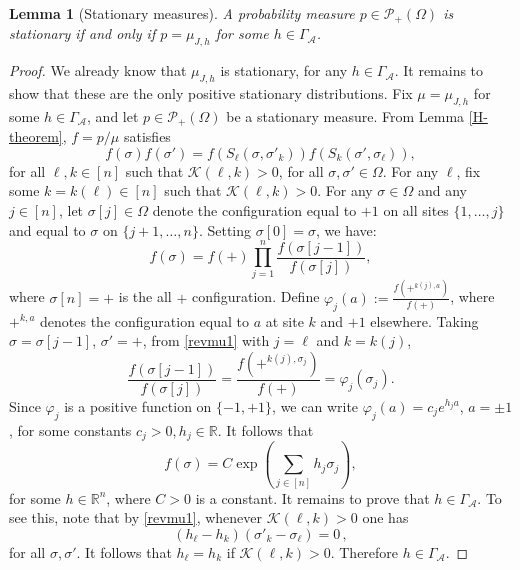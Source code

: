 \documentclass[11pt,reqno]{amsart}
\numberwithin{equation}{section}
\numberwithin{figure}{section}
\newtheorem{lemma}[theorem]{Lemma}
\newcommand{\1}{\mathds{1}}
\let\si=\sigma
\let\G=\Gamma
\newcommand{\cA}{\ensuremath{\mathcal A}}
\newcommand{\cK}{\ensuremath{\mathcal K}}
\newcommand{\bbR}{{\ensuremath{\mathbb R}} }
\begin{document}
\begin{lemma}[Stationary measures] \label{charact-of-stationarity}
A probability measure \(p \in \mathcal{P}_+(\Omega)\)
is stationary  if and only if \(p =\mu_{J,h}\) for some $h\in\G_\cA$.
\end{lemma}
\begin{proof}%
We already know that $\mu_{J,h}$ is stationary, for any $h\in\G_\cA$. It remains to show that these are the only positive stationary distributions. 
Fix $\mu=\mu_{J,h}$ for some $h\in\G_\cA$, and let \(p \in \mathcal{P}_+(\Omega)\)
be a stationary measure. From Lemma \ref{H-theorem}, $f=p/\mu$ satisfies
\begin{equation}
\label{revmu1}
f(\sigma)f(\sigma')= f(S_\ell(\sigma, \sigma'_k))f(S_k(\sigma', \sigma_\ell)),
\end{equation}
for all  \(\ell, k \in [n]\) such that \(\mathcal{K}(\ell, k) > 0\), for all \(\sigma, \sigma' \in \Omega\).
For any $\ell$, fix some $k=k(\ell)\in[n]$ such that \(\mathcal{K}(\ell, k) > 0\). 
For any \(\sigma \in \Omega\) and any \(j \in [n]\), let \(\sigma[j] \in \Omega\) denote the configuration equal to \(+1\) on all sites \(\{1, \dots, j\}\) and equal to \(\sigma\) on \(\{j+1, \dots, n\}\). Setting \(\sigma[0] = \sigma\), we have:
\[
  f(\sigma) = f(+) \prod_{j=1}^n \frac{f(\sigma[j-1])}{f(\sigma[j])},
\]
where $\si[n]=+$ is the all $+$ configuration.
Define \(\varphi_j(a) := \frac{f(+^{k(j), a})}{f(+)}\), where \(+^{k,a}\) denotes the configuration equal to \(a\) at site \(k\) and \(+1\) elsewhere. 
Taking $\si=\si[j-1]$, $\si'=+$, from \eqref{revmu1} with $j=\ell$ and $k=k(j)$, 
\[
  \frac{f(\sigma[j-1])}{f(\sigma[j])} = \frac{f(+^{k(j), \sigma_j})}{f(+)} = \varphi_j(\sigma_j).
\]
Since \(\varphi_j\) is a positive function on \(\{-1, +1\}\), we can write \(\varphi_j(a) = c_j e^{h_j a}\), \(a = \pm 1\), for some constants \(c_j>0,h_j \in \mathbb{R}\). It follows that
\[
f(\sigma) =C\exp\left(\textstyle{\sum_{j \in [n]}} h_j\sigma_j \right),
\]
for some $h\in\bbR^n$, where $C>0$ is a constant.
It remains to prove that $h\in\G_\cA$. To see this, note that by \eqref{revmu1}, whenever $\cK(\ell,k)>0$ one has
\begin{equation}
\label{revmu2}
(h_\ell-h_k)(\si'_k-\si_\ell) = 0\,,
\end{equation}
for all $\si,\si'$. It follows that $h_\ell=h_k$ if $\cK(\ell,k)>0$. Therefore $h\in\G_\cA$.
\end{proof}
\end{document}
